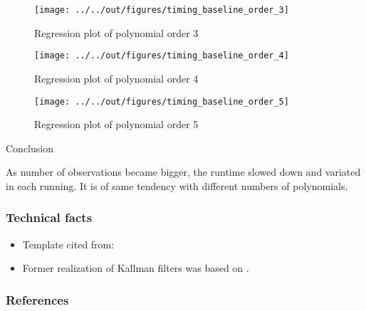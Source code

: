\documentclass[11pt]{beamer}
\begin{document}
\begin{frame}
        \begin{figure}
    \caption{Regression plot of polynomial order 3}
    \texttt{[image: ../../out/figures/timing\_baseline\_order\_3]}
        \end{figure}
\end{frame}


\begin{frame}
        \begin{figure}
    \caption{Regression plot of polynomial order 4}
    \texttt{[image: ../../out/figures/timing\_baseline\_order\_4]}
        \end{figure}
\end{frame}


\begin{frame}
        \begin{figure}
    \caption{Regression plot of polynomial order 5}
    \texttt{[image: ../../out/figures/timing\_baseline\_order\_5]}
        \end{figure}
\end{frame}


\begin{frame}
Conclusion
\end{frame}


\begin{frame}
        As number of observations became bigger, the runtime slowed down and variated in each running. It is of same tendency with different numbers of polynomials.
\end{frame}


\begin{frame}[t]
    \frametitle{Technical facts}
    \begin{itemize}
        \item<+-> Template cited from: \citet{GaudeckerEconProjectTemplates}
        \item<+-> Former realization of Kallman filters was based on \citet{Gabler18}.
    \end{itemize}
    \note{~}
\end{frame}


 {
    \begin{frame}
        \frametitle{}
    \end{frame}

}

\begin{frame}[allowframebreaks]
    \frametitle{References}
    
    
    
\end{frame}
\end{document}
